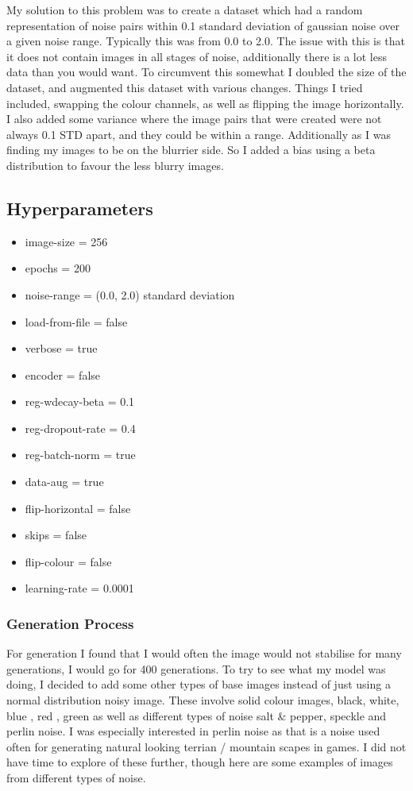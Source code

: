 \documentclass[12pt]{article}
\begin{document}
My solution to this problem was to create a dataset which had a random representation of noise pairs within 0.1 standard deviation of gaussian noise over a given noise range. Typically
this was from 0.0 to 2.0. The issue with this is that it does not contain images in all stages of noise, additionally there is a lot less data than you would want. To circumvent this
somewhat I doubled the size of the dataset, and augmented this dataset with various changes. Things I tried included, swapping the colour channels, as well as flipping the image 
horizontally. I also added some variance where the image pairs that were created were not always 0.1 STD apart, and they could be within a range. Additionally as I was finding my images
to be on the blurrier side. So I added a bias using a beta distribution to favour the less blurry images.

\subsection{Hyperparameters}
\begin{itemize}
    \item image-size = 256
    \item epochs = 200
    \item noise-range = (0.0, 2.0) standard deviation
    \item load-from-file = false
    \item verbose = true
    \item encoder = false
    \item reg-wdecay-beta = 0.1
    \item reg-dropout-rate = 0.4
    \item reg-batch-norm = true
    \item data-aug = true
    \item flip-horizontal = false
    \item skips = false
    \item flip-colour = false
    \item learning-rate = 0.0001
\end{itemize}
\subsubsection{Generation Process}

For generation I found that I would often the image would not stabilise for many generations, I would go for 400 generations. To try to see what my model was doing, I decided to add some
other types of base images instead of just using a normal distribution noisy image. These involve solid colour images, black, white, blue , red , green as well as different types of noise
salt \& pepper, speckle and perlin noise. I was especially interested in perlin noise as that is a noise used often for generating natural looking terrian / mountain scapes in games.
I did not have time to explore of these further, though here are some examples of images from different types of noise. 
\end{document}
